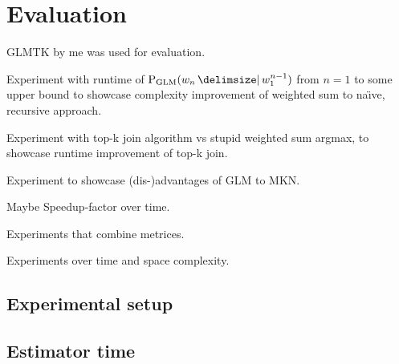 \chapter{Evaluation}
\label{ch:evaluation}

\begin{draft}
GLMTK by me was used for evaluation.

Experiment with runtime of $\ProbGLM{w_n}{w_1^{n-1}}$ from $n=1$ to some upper
bound to showcase complexity improvement of weighted sum to na{\"\i}ve,
recursive approach.

Experiment with top-k join algorithm vs stupid weighted sum argmax, to showcase
runtime improvement of top-k join.

Experiment to showcase (dis-)advantages of GLM to MKN.

Maybe Speedup-factor over time.

Experiments that combine metrices.

Experiments over time and space complexity.
\end{draft}

\section{Experimental setup}

\section{Estimator time}

\begin{figure}
  \centering
  
  \caption{}
\end{figure}

\begin{figure}
  \centering
  
  \caption{}
\end{figure}
